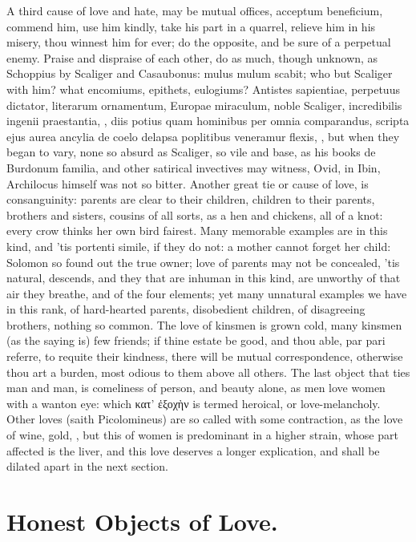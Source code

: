 {A third cause of love and hate, may be mutual offices, acceptum
beneficium, commend him, use him kindly, take his part in a
quarrel, relieve him in his misery, thou winnest him for ever; do the
opposite, and be sure of a perpetual enemy. Praise and dispraise of
each other, do as much, though unknown, as Schoppius by Scaliger
and Casaubonus: mulus mulum scabit; who but Scaliger with him? what
encomiums, epithets, eulogiums? Antistes sapientiae, perpetuus
dictator, literarum ornamentum, Europae miraculum, noble Scaliger,
 incredibilis ingenii praestantia, \etc{}, diis potius quam
hominibus per omnia comparandus, scripta ejus aurea ancylia de coelo
delapsa poplitibus veneramur flexis, \etc{}, but when they began to
vary, none so absurd as Scaliger, so vile and base, as his books de
Burdonum familia, and other satirical invectives may witness, Ovid, in
Ibin, Archilocus himself was not so bitter. Another great tie or cause
of love, is consanguinity: parents are clear to their children,
children to their parents, brothers and sisters, cousins of all sorts,
as a hen and chickens, all of a knot: every crow thinks her own bird
fairest. Many memorable examples are in this kind, and 'tis portenti
simile, if they do not: a mother cannot forget her child: Solomon
so found out the true owner; love of parents may not be concealed, 'tis
natural, descends, and they that are inhuman in this kind, are unworthy
of that air they breathe, and of the four elements; yet many unnatural
examples we have in this rank, of hard-hearted parents, disobedient
children, of disagreeing brothers, nothing so common. The love of
kinsmen is grown cold, many kinsmen (as the saying is) few
friends; if thine estate be good, and thou able, par pari referre, to
requite their kindness, there will be mutual correspondence, otherwise
thou art a burden, most odious to them above all others. The last
object that ties man and man, is comeliness of person, and beauty
alone, as men love women with a wanton eye: which κατ' ἐξοχὴν is termed
heroical, or love-melancholy. Other loves (saith Picolomineus) are so
called with some contraction, as the love of wine, gold, \etc{}, but this
of women is predominant in a higher strain, whose part affected is the
liver, and this love deserves a longer explication, and shall be
dilated apart in the next section.

\section{Honest Objects of Love.}

}
